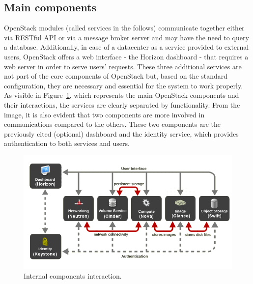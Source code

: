 \subsection{Main components}
\label{a:main_components}
OpenStack modules (called services in the follows) communicate together either via RESTful API or via a message broker server and may have the need to query a database. Additionally, in case of a datacenter as a service provided to external users, OpenStack offers a web interface - the Horizon dashboard - that requires a web server in order to serve users' requests.
These three additional services are not part of the core components of OpenStack but, based on the standard configuration, they are necessary and essential for the system to work properly.
As visible in Figure~\ref{fig:OS_components_interraction_logical}, which represents the main OpenStack components and their interactions, the services are clearly separated by functionality. From the image, it is also evident that two components are more involved in communications compared to the others. These two components are the previously cited (optional) dashboard and the identity service, which provides authentication to both services and users.
\begin{figure}[h]
	\centering
	\includegraphics[clip= true, width= \columnwidth]{images/openstack_core_components.png}
	\caption{Internal components interaction.}
	\label{fig:OS_components_interraction_logical}
\end{figure}

